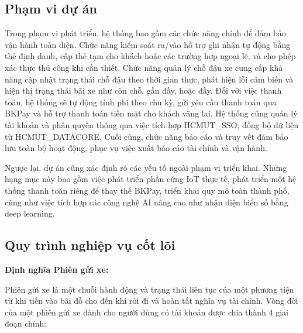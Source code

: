 \documentclass[a4paper,12pt]{article}
\begin{document}
\subsection{Phạm vi dự án}
Trong phạm vi phát triển, hệ thống bao gồm các chức năng chính để đảm bảo vận hành toàn diện. Chức năng kiểm soát ra/vào hỗ trợ ghi nhận tự động bằng thẻ định danh, cấp thẻ tạm cho khách hoặc các trường hợp ngoại lệ, và cho phép xác thực thủ công khi cần thiết. Chức năng quản lý chỗ đậu xe cung cấp khả năng cập nhật trạng thái chỗ đậu theo thời gian thực, phát hiện lỗi cảm biến và hiện thị trạng thái bãi xe như còn chỗ, gần đầy, hoặc đầy. Đối với việc thanh toán, hệ thống sẽ tự động tính phí theo chu kỳ, gửi yêu cầu thanh toán qua BKPay và hỗ trợ thanh toán tiền mặt cho khách vãng lai. Hệ thống cũng quản lý tài khoản và phân quyền thông qua việc tích hợp HCMUT\_SSO, đồng bộ dữ liệu từ HCMUT\_DATACORE. Cuối cùng, chức năng báo cáo và truy vết đảm bảo lưu toàn bộ hoạt động, phục vụ việc xuất báo cáo tài chính và vận hành.

Ngược lại, dự án cũng xác định rõ các yếu tố ngoài phạm vi triển khai. Những hạng mục này bao gồm việc phát triển phần cứng IoT thực tế, phát triển một hệ thống thanh toán riêng để thay thế BKPay, triển khai quy mô toàn thành phố, cũng như việc tích hợp các công nghệ AI nâng cao như nhận diện biển số bằng deep learning.
\subsection{Quy trình nghiệp vụ cốt lõi}

\textbf{Định nghĩa Phiên gửi xe:}

Phiên gửi xe là một chuỗi hành động và trạng thái liên tục của một phương tiện từ khi tiến vào bãi đỗ cho đến khi rời đi và hoàn tất nghĩa vụ tài chính. Vòng đời của một phiên gửi xe dành cho người dùng có tài khoản được chia thành 4 giai đoạn chính:
\end{document}
